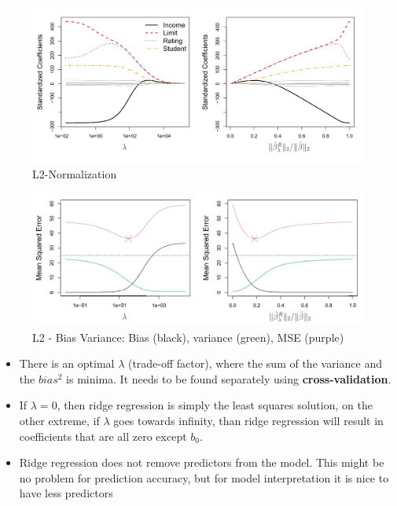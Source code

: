 \documentclass[../Main.tex]{subfiles}
\begin{document}
\begin{figure}[H]
    \centering
    \includegraphics[width=1\linewidth]{Images/l2-norm.png}
    \caption{L2-Normalization}
\end{figure}

\begin{figure}[H]
    \centering
    \includegraphics[width=1\linewidth]{Images/l2-bias-variance.png}
    \caption{L2 - Bias Variance: Bias (black), variance (green), MSE (purple)}
\end{figure}

\begin{itemize}
    \item There is an optimal \(\lambda\) (trade-off factor), where the sum of the variance and the \(bias^2\) is 
    minima. It needs to be found separately using \textbf{cross-validation}.
    \item If \(\lambda=0\), then ridge regression is 
    simply the least squares solution, on the other extreme, if \(\lambda\) goes towards infinity, 
    than ridge regression will result in coefficients that are all zero except \(b_0\).
    \item Ridge regression does not remove predictors from the model. This might be no problem for prediction 
    accuracy, but for model interpretation it is nice to have less predictors
\end{itemize}
\end{document}
